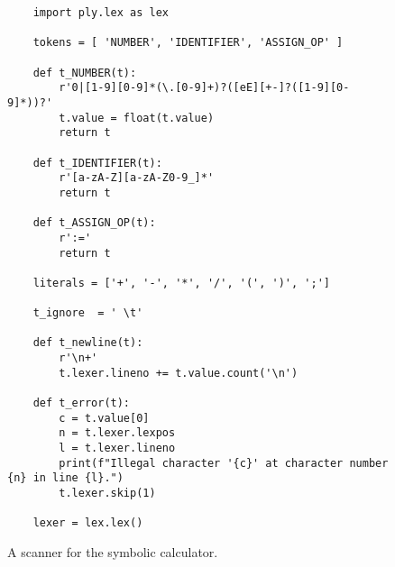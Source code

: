 \begin{figure}[!ht]
\centering
\begin{verbatim}
    import ply.lex as lex
    
    tokens = [ 'NUMBER', 'IDENTIFIER', 'ASSIGN_OP' ]
    
    def t_NUMBER(t):
        r'0|[1-9][0-9]*(\.[0-9]+)?([eE][+-]?([1-9][0-9]*))?'
        t.value = float(t.value)
        return t
    
    def t_IDENTIFIER(t):
        r'[a-zA-Z][a-zA-Z0-9_]*'
        return t
    
    def t_ASSIGN_OP(t):
        r':='
        return t
    
    literals = ['+', '-', '*', '/', '(', ')', ';']
    
    t_ignore  = ' \t'

    def t_newline(t):
        r'\n+'
        t.lexer.lineno += t.value.count('\n')
        
    def t_error(t):
        c = t.value[0]
        n = t.lexer.lexpos
        l = t.lexer.lineno
        print(f"Illegal character '{c}' at character number {n} in line {l}.")
        t.lexer.skip(1)
    
    lexer = lex.lex()
\end{verbatim}
\vspace*{-0.3cm}
\caption{A scanner for the symbolic calculator.}
\label{fig:Symbolic-Calculator.ipynb:lex}
\end{figure}

